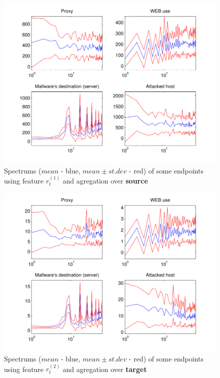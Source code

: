 \documentclass[a4paper]{IEEEtran}
\begin{document}
\begin{figure}[t!]%
  \centering
  \includegraphics[width=150mm]{spect_src_bdivp}
  \caption{Spectrums ($mean$ - blue, $mean\pm st.dev$ - red) of some  endpoints using feature $r_t^{(1)}$ and agregation over \textbf{source}}
  \label{fig:spect_src_bdivp}
\end{figure}
\begin{figure}[t!]%
  \centering
  \includegraphics[width=150mm]{spect_dst_logp}
  \caption{Spectrums ($mean$ - blue, $mean\pm st.dev$ - red) of some  endpoints using feature $r_t^{(2)}$ and agregation over \textbf{target}}
  \label{fig:spect_dst_logp}
\end{figure}
\end{document}
